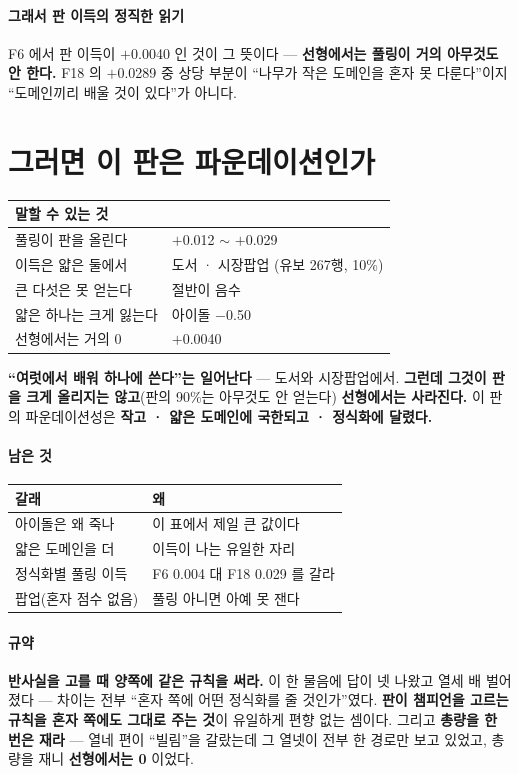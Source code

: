 \documentclass[10pt]{article}
\begin{document}
\paragraph{그래서 판 이득의 정직한 읽기} F6 에서 판 이득이 $+$0.0040 인 것이
그 뜻이다 --- \textbf{선형에서는 풀링이 거의 아무것도 안 한다.} F18 의
$+$0.0289 중 상당 부분이 ``나무가 작은 도메인을 혼자 못 다룬다''이지
``도메인끼리 배울 것이 있다''가 아니다.

\section{그러면 이 판은 파운데이션인가}

\begin{center}\footnotesize
\begin{tabular}{ll}
\hline
말할 수 있는 것 & \\
\hline
풀링이 판을 올린다 & $+$0.012 $\sim$ $+$0.029 \\
이득은 얇은 둘에서 & 도서 · 시장팝업 (유보 267행, 10\%) \\
큰 다섯은 못 얻는다 & 절반이 음수 \\
얇은 하나는 크게 잃는다 & 아이돌 $-$0.50 \\
선형에서는 거의 0 & $+$0.0040 \\
\hline
\end{tabular}
\end{center}

\textbf{``여럿에서 배워 하나에 쓴다''는 일어난다} --- 도서와 시장팝업에서.
\textbf{그런데 그것이 판을 크게 올리지는 않고}(판의 90\%는 아무것도 안
얻는다) \textbf{선형에서는 사라진다.} 이 판의 파운데이션성은
\textbf{작고 · 얇은 도메인에 국한되고 · 정식화에 달렸다.}

\paragraph{남은 것}
\begin{center}\small
\begin{tabular}{ll}
\hline
갈래 & 왜 \\
\hline
아이돌은 왜 죽나 & 이 표에서 제일 큰 값이다 \\
얇은 도메인을 더 & 이득이 나는 유일한 자리 \\
정식화별 풀링 이득 & F6 0.004 대 F18 0.029 를 갈라 \\
팝업(혼자 점수 없음) & 풀링 아니면 아예 못 잰다 \\
\hline
\end{tabular}
\end{center}

\paragraph{규약} \textbf{반사실을 고를 때 양쪽에 같은 규칙을 써라.} 이
한 물음에 답이 넷 나왔고 열세 배 벌어졌다 --- 차이는 전부 ``혼자 쪽에
어떤 정식화를 줄 것인가''였다. \textbf{판이 챔피언을 고르는 규칙을 혼자
쪽에도 그대로 주는 것}이 유일하게 편향 없는 셈이다. 그리고 \textbf{총량을
한 번은 재라} --- 열네 편이 ``빌림''을 갈랐는데 그 열넷이 전부 한 경로만
보고 있었고, 총량을 재니 \textbf{선형에서는 0} 이었다.
\end{document}
